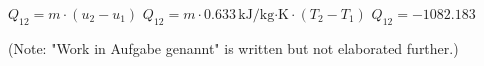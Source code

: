 \( Q_{12} = m \cdot (u_2 - u_1) \)  
\( Q_{12} = m \cdot 0.633 \, \text{kJ/kg·K} \cdot (T_2 - T_1) \)  
\( Q_{12} = -1082.183 \)  

(Note: "Work in Aufgabe genannt" is written but not elaborated further.)
